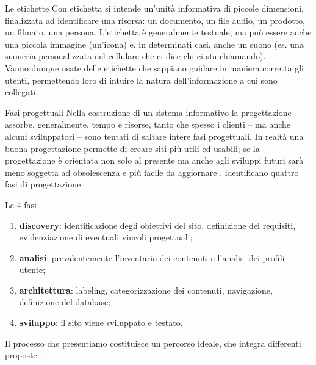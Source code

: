 \documentclass[pdf,mpa]{prosper}
\begin{document}
\begin{slide}{Le etichette}
Con etichetta si intende un'unità informativa di piccole dimensioni, finalizzata ad identificare una risorsa: un documento, un file audio, un prodotto, un filmato, una persona. L'etichetta è generalmente testuale, ma può essere anche una piccola immagine (un'icona) e, in determinati casi, anche un suono (es. una suoneria personalizzata nel cellulare che ci dice chi ci sta chiamando).\\
Vanno dunque usate delle etichette che sappiano guidare in maniera corretta gli utenti, permettendo loro di intuire la natura dell'informazione a cui sono collegati.

\end{slide}

\begin{slide}{Fasi progettuali}
Nella costruzione di un sistema informativo la progettazione assorbe, generalmente, tempo e risorse, tanto che spesso i clienti -- ma anche alcuni sviluppatori -- sono tentati di saltare intere fasi progettuali. In realtà una buona progettazione permette di creare siti più utili ed usabili; se la progettazione è orientata non solo al presente ma anche agli sviluppi futuri sarà meno soggetta ad obsolescenza e più facile da aggiornare \citep{FuccellaPizzolato1998}. \cite{CaprioGhiglione2003} identificano quattro fasi di progettazione
\end{slide}

\begin{slide}{Le 4 fasi}
\begin{enumerate}
\item \textbf{discovery}: identificazione degli obiettivi del sito, definizione dei requisiti, evidenziazione di eventuali vincoli progettuali; 
\item \textbf{analisi}: prevalentemente l'inventario dei contenuti e l'analisi dei profili utente;
\item \textbf{architettura}: labeling, categorizzazione dei contenuti, navigazione, definizione del database;
\item \textbf{sviluppo}: il sito viene sviluppato e testato.
\end{enumerate}
Il processo che presentiamo costituisce un percorso ideale, che integra differenti proposte \citep{FuccellaPizzolato1998, CaprioGhiglione2003, Sinha2004, McGovern2002, McQuaidMcManus2003}.
\end{slide}
\end{document}
